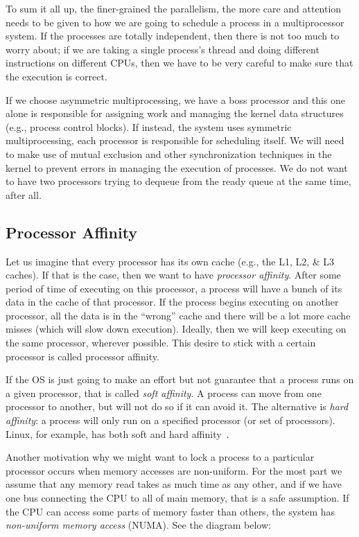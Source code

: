 To sum it all up, the finer-grained the parallelism, the more care and attention needs to be given to how we are going to schedule a process in a multiprocessor system. If the processes are totally independent, then there is not too much to worry about; if we are taking a single process's thread and doing different instructions on different CPUs, then we have to be very careful to make sure that the execution is correct.

If we choose asymmetric multiprocessing, we have a boss processor and this one alone is responsible for assigning work and managing the kernel data structures (e.g., process control blocks). If instead, the system uses symmetric multiprocessing, each processor is responsible for scheduling itself. We will need to make use of mutual exclusion and other synchronization techniques in the kernel to prevent errors in managing the execution of processes. We do not want to have two processors trying to dequeue from the ready queue at the same time, after all.

\subsection*{Processor Affinity}
Let us imagine that every processor has its own cache (e.g., the L1, L2, \& L3 caches). If that is the case, then we want to have \textit{processor affinity}. After some period of time of executing on this processor, a process will have a bunch of its data in the cache of that processor. If the process begins executing on another processor, all the data is in the ``wrong'' cache and there will be a lot more cache misses (which will slow down execution). Ideally, then we will keep executing on the same processor, wherever possible. This desire to stick with a certain processor is called processor affinity.

If the OS is just going to make an effort but not guarantee that a process runs on a given processor, that is called \textit{soft affinity}. A process can move from one processor to another, but will not do so if it can avoid it. The alternative is \textit{hard affinity}: a process will only run on a specified processor (or set of processors). Linux, for example, has both soft and hard affinity~\cite{osc}.

Another motivation why we might want to lock a process to a particular processor occurs when memory accesses are non-uniform. For the most part we assume that any memory read takes as much time as any other, and if we have one bus connecting the CPU to all of main memory, that is a safe assumption. If the CPU can access some parts of memory faster than others, the system has \textit{non-uniform memory access} (NUMA). See the diagram below:


